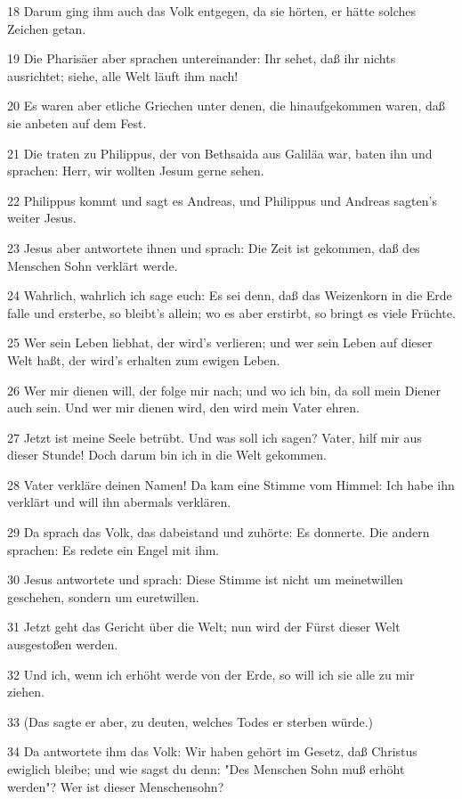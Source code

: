 \par 18 Darum ging ihm auch das Volk entgegen, da sie hörten, er hätte solches Zeichen getan.
\par 19 Die Pharisäer aber sprachen untereinander: Ihr sehet, daß ihr nichts ausrichtet; siehe, alle Welt läuft ihm nach!
\par 20 Es waren aber etliche Griechen unter denen, die hinaufgekommen waren, daß sie anbeten auf dem Fest.
\par 21 Die traten zu Philippus, der von Bethsaida aus Galiläa war, baten ihn und sprachen: Herr, wir wollten Jesum gerne sehen.
\par 22 Philippus kommt und sagt es Andreas, und Philippus und Andreas sagten's weiter Jesus.
\par 23 Jesus aber antwortete ihnen und sprach: Die Zeit ist gekommen, daß des Menschen Sohn verklärt werde.
\par 24 Wahrlich, wahrlich ich sage euch: Es sei denn, daß das Weizenkorn in die Erde falle und ersterbe, so bleibt's allein; wo es aber erstirbt, so bringt es viele Früchte.
\par 25 Wer sein Leben liebhat, der wird's verlieren; und wer sein Leben auf dieser Welt haßt, der wird's erhalten zum ewigen Leben.
\par 26 Wer mir dienen will, der folge mir nach; und wo ich bin, da soll mein Diener auch sein. Und wer mir dienen wird, den wird mein Vater ehren.
\par 27 Jetzt ist meine Seele betrübt. Und was soll ich sagen? Vater, hilf mir aus dieser Stunde! Doch darum bin ich in die Welt gekommen.
\par 28 Vater verkläre deinen Namen! Da kam eine Stimme vom Himmel: Ich habe ihn verklärt und will ihn abermals verklären.
\par 29 Da sprach das Volk, das dabeistand und zuhörte: Es donnerte. Die andern sprachen: Es redete ein Engel mit ihm.
\par 30 Jesus antwortete und sprach: Diese Stimme ist nicht um meinetwillen geschehen, sondern um euretwillen.
\par 31 Jetzt geht das Gericht über die Welt; nun wird der Fürst dieser Welt ausgestoßen werden.
\par 32 Und ich, wenn ich erhöht werde von der Erde, so will ich sie alle zu mir ziehen.
\par 33 (Das sagte er aber, zu deuten, welches Todes er sterben würde.)
\par 34 Da antwortete ihm das Volk: Wir haben gehört im Gesetz, daß Christus ewiglich bleibe; und wie sagst du denn: "Des Menschen Sohn muß erhöht werden"? Wer ist dieser Menschensohn?
